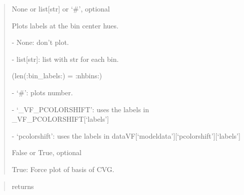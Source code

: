 \documentclass[letterpaper,10pt,english]{sphinxmanual}
\begin{document}
\begin{fulllineitems}
\begin{description}
\begin{quote}
\begin{description}
\item[{bin\_labels}] \leavevmode
\begin{DUlineblock}{0em}
\item[] None or list{[}str{]} or ‘\#’, optional
\item[] Plots labels at the bin center hues.
\item[]
\begin{DUlineblock}{\DUlineblockindent}
\item[] - None: don’t plot.
\item[] - list{[}str{]}: list with str for each bin. 
\item[]
\begin{DUlineblock}{\DUlineblockindent}
\item[] (len(:bin\_labels:) = :nhbins:)
\end{DUlineblock}
\item[] - ‘\#’: plots number.
\item[] - ‘\_VF\_PCOLORSHIFT’: uses the labels in \_VF\_PCOLORSHIFT{[}‘labels’{]}
\item[] - ‘pcolorshift’: uses the labels in dataVF{[}‘modeldata’{]}{[}‘pcolorshift’{]}{[}‘labels’{]}
\end{DUlineblock}
\end{DUlineblock}

\item[{force\_CVG\_layout}] \leavevmode
\begin{DUlineblock}{0em}
\item[] False or True, optional
\item[] True: Force plot of basis of CVG.
\end{DUlineblock}

\end{description}\end{quote}

\item[{Returns:}] \leavevmode\begin{quote}\begin{description}
\item[{returns}] \leavevmode
{}

\end{description}\end{quote}

\end{description}

\end{fulllineitems}
\end{document}
